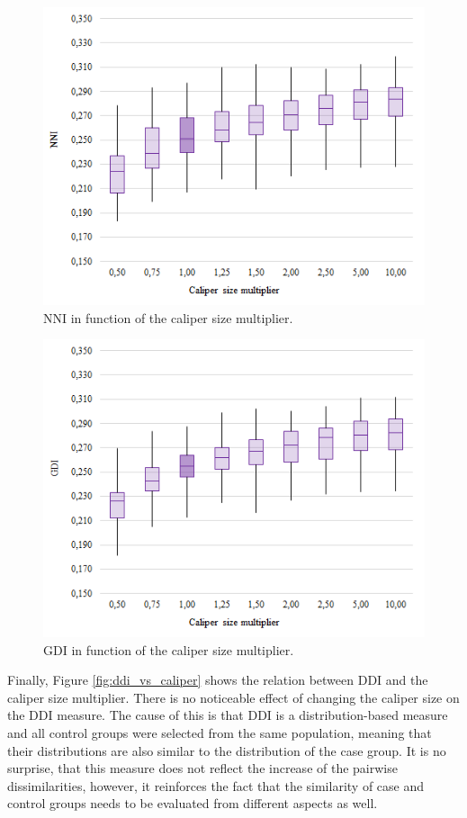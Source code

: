 		\begin{figure}[h]
			\centering
                \captionsetup{justification=centering}
			\includegraphics[width=0.6\linewidth]{assets/figures/control_group_selection/measures/nni_vs_caliper.png}
                \caption{NNI in function of the caliper size multiplier.}
			\label{fig:nni_vs_caliper}
		\end{figure}
								
		\begin{figure}[h]
			\centering
                \captionsetup{justification=centering}
			\includegraphics[width=0.6\linewidth]{assets/figures/control_group_selection/measures/gdi_vs_caliper.png}
                \caption{GDI in function of the caliper size multiplier.}
			\label{fig:gdi_vs_caliper}
		\end{figure}
									
		Finally, Figure \ref{fig:ddi_vs_caliper} shows the relation between DDI and the caliper size multiplier. There is no noticeable effect of changing the caliper size on the DDI measure. The cause of this is that DDI is a distribution-based measure and all control groups were selected from the same population, meaning that their distributions are also similar to the distribution of the case group. It is no surprise, that this measure does not reflect the increase of the pairwise dissimilarities, however, it reinforces the fact that the similarity of case and control groups needs to be evaluated from different aspects as well.
						
